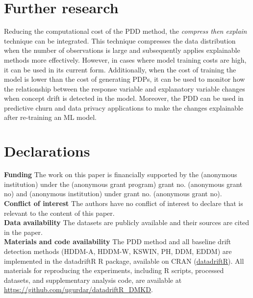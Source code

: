 \documentclass[pdflatex,sn-mathphys-ay]{sn-jnl}%
\theoremstyle{thmstyleone}%
\theoremstyle{thmstyletwo}%
\theoremstyle{thmstylethree}%
\begin{document}
\section*{Further research}

Reducing the computational cost of the PDD method, the \textit{compress then explain} \citep{hubert_2024} technique can be integrated. This technique compresses the data distribution when the number of observations is large and subsequently applies explainable methods more effectively. However, in cases where model training costs are high, it can be used in its current form. Additionally, when the cost of training the model is lower than the cost of generating PDPs, it can be used to monitor how the relationship between the response variable and explanatory variable changes when concept drift is detected in the model. Moreover, the PDD can be used in predictive churn and data privacy applications to make the changes explainable after re-training an ML model. 

\section*{Declarations}

\textbf{Funding} The work on this paper is financially supported by the (anonymous institution) under the (anonymous grant program) grant no. (anonymous grant no) and (anonymous institution) under grant no. (anonymous grant no).\\

\noindent \textbf{Conflict of interest} The authors have no conflict of interest to declare that is relevant to the content of this paper.\\

\noindent \textbf{Data availability} The datasets are publicly available and their sources are cited in the paper.\\

\noindent \textbf{Materials and code availability} The PDD method and all baseline drift detection methods (HDDM-A, HDDM-W, KSWIN, PH, DDM, EDDM) are implemented in the datadriftR R package, available on CRAN (\href{https://cran.r-project.org/package=datadriftR}{datadriftR}). All materials for reproducing the experiments, including R scripts, processed datasets, and supplementary analysis code, are available at \href{https://github.com/ugurdar/datadriftR_DMKD}{https://github.com/ugurdar/datadriftR\_DMKD}.\\
\end{document}
